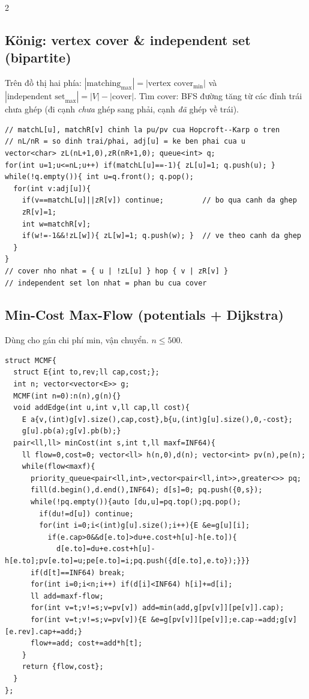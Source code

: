 \documentclass[8pt]{extarticle}
\begin{document}
\begin{multicols}{2}
\subsection{König: vertex cover \& independent set (bipartite)}
Trên đồ thị hai phía: $|\text{matching}_{\max}| = |\text{vertex cover}_{\min}|$ và $|\text{independent set}_{\max}| = |V| - |\text{cover}|$. Tìm cover: BFS đường tăng từ các đỉnh trái chưa ghép (đi cạnh \emph{chưa} ghép sang phải, cạnh \emph{đã} ghép về trái).
\begin{lstlisting}
// matchL[u], matchR[v] chinh la pu/pv cua Hopcroft--Karp o tren
// nL/nR = so dinh trai/phai, adj[u] = ke ben phai cua u
vector<char> zL(nL+1,0),zR(nR+1,0); queue<int> q;
for(int u=1;u<=nL;u++) if(matchL[u]==-1){ zL[u]=1; q.push(u); }
while(!q.empty()){ int u=q.front(); q.pop();
  for(int v:adj[u]){
    if(v==matchL[u]||zR[v]) continue;         // bo qua canh da ghep
    zR[v]=1;
    int w=matchR[v];
    if(w!=-1&&!zL[w]){ zL[w]=1; q.push(w); }  // ve theo canh da ghep
  }
}
// cover nho nhat = { u | !zL[u] } hop { v | zR[v] }
// independent set lon nhat = phan bu cua cover
\end{lstlisting}

\subsection{Min-Cost Max-Flow (potentials + Dijkstra)}
Dùng cho gán chi phí min, vận chuyển. $n\le 500$.
\begin{lstlisting}
struct MCMF{
  struct E{int to,rev;ll cap,cost;};
  int n; vector<vector<E>> g;
  MCMF(int n=0):n(n),g(n){}
  void addEdge(int u,int v,ll cap,ll cost){
    E a{v,(int)g[v].size(),cap,cost},b{u,(int)g[u].size(),0,-cost};
    g[u].pb(a);g[v].pb(b);}
  pair<ll,ll> minCost(int s,int t,ll maxf=INF64){
    ll flow=0,cost=0; vector<ll> h(n,0),d(n); vector<int> pv(n),pe(n);
    while(flow<maxf){
      priority_queue<pair<ll,int>,vector<pair<ll,int>>,greater<>> pq;
      fill(d.begin(),d.end(),INF64); d[s]=0; pq.push({0,s});
      while(!pq.empty()){auto [du,u]=pq.top();pq.pop();
        if(du!=d[u]) continue;
        for(int i=0;i<(int)g[u].size();i++){E &e=g[u][i];
          if(e.cap>0&&d[e.to]>du+e.cost+h[u]-h[e.to]){
            d[e.to]=du+e.cost+h[u]-h[e.to];pv[e.to]=u;pe[e.to]=i;pq.push({d[e.to],e.to});}}}
      if(d[t]==INF64) break;
      for(int i=0;i<n;i++) if(d[i]<INF64) h[i]+=d[i];
      ll add=maxf-flow;
      for(int v=t;v!=s;v=pv[v]) add=min(add,g[pv[v]][pe[v]].cap);
      for(int v=t;v!=s;v=pv[v]){E &e=g[pv[v]][pe[v]];e.cap-=add;g[v][e.rev].cap+=add;}
      flow+=add; cost+=add*h[t];
    }
    return {flow,cost};
  }
};
\end{lstlisting}


\end{multicols}
\end{document}
